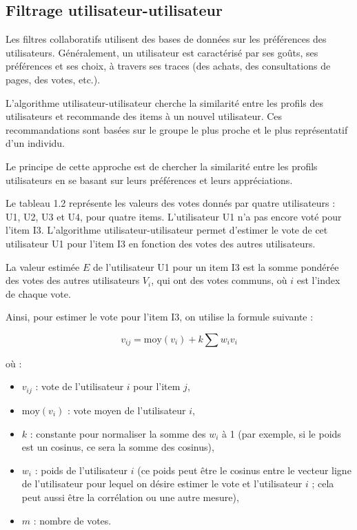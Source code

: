 \subsection{Filtrage utilisateur-utilisateur}

Les filtres collaboratifs utilisent des bases de données sur les préférences des utilisateurs. Généralement, un utilisateur est caractérisé par ses goûts, ses préférences et ses choix, à travers ses traces (des achats, des consultations de pages, des votes, etc.). 

L'algorithme utilisateur-utilisateur cherche la similarité entre les profils des utilisateurs et recommande des items à un nouvel utilisateur. Ces recommandations sont basées sur le groupe le plus proche et le plus représentatif d’un individu. 

Le principe de cette approche est de chercher la similarité entre les profils utilisateurs en se basant sur leurs préférences et leurs appréciations.

Le tableau 1.2 représente les valeurs des votes donnés par quatre utilisateurs : U1, U2, U3 et U4, pour quatre items. L’utilisateur U1 n’a pas encore voté pour l’item I3. L’algorithme utilisateur-utilisateur permet d’estimer le vote de cet utilisateur U1 pour l’item I3 en fonction des votes des autres utilisateurs.

La valeur estimée $E$ de l'utilisateur U1 pour un item I3 est la somme pondérée des votes des autres utilisateurs $V_i$, qui ont des votes communs, où $i$ est l’index de chaque vote.

Ainsi, pour estimer le vote pour l’item I3, on utilise la formule suivante :

\[
v_{ij} = \text{moy}(v_i) + k \sum w_i v_i
\]

où :

\begin{itemize}
    \item $v_{ij}$ : vote de l’utilisateur $i$ pour l’item $j$,
    \item $\text{moy}(v_i)$ : vote moyen de l’utilisateur $i$,
    \item $k$ : constante pour normaliser la somme des $w_i$ à 1 (par exemple, si le poids est un cosinus, ce sera la somme des cosinus),
    \item $w_i$ : poids de l’utilisateur $i$ (ce poids peut être le cosinus entre le vecteur ligne de l’utilisateur pour lequel on désire estimer le vote et l’utilisateur $i$ ; cela peut aussi être la corrélation ou une autre mesure),
    \item $m$ : nombre de votes.
\end{itemize}
